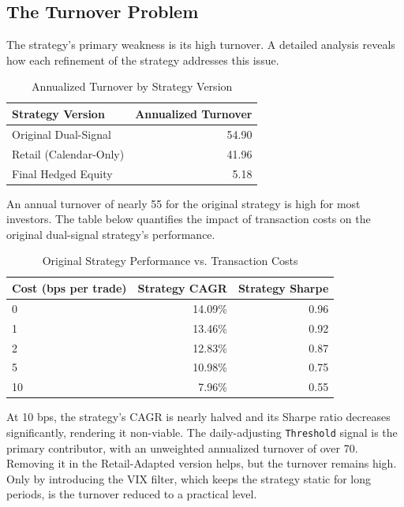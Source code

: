 \documentclass{article}
\begin{document}
\subsection{The Turnover Problem}
The strategy's primary weakness is its high turnover. A detailed analysis reveals how each refinement of the strategy addresses this issue.

\begin{table}[htbp]
\centering
\caption{Annualized Turnover by Strategy Version}
\begin{tabular}{lr}
\toprule
\textbf{Strategy Version} & \textbf{Annualized Turnover} \\
\midrule
Original Dual-Signal      & 54.90 \\
Retail (Calendar-Only)    & 41.96 \\
Final Hedged Equity       & 5.18  \\
\bottomrule
\end{tabular}
\end{table}

An annual turnover of nearly 55 for the original strategy is high for most investors. The table below quantifies the impact of transaction costs on the original dual-signal strategy's performance.

\begin{table}[htbp]
\centering
\caption{Original Strategy Performance vs. Transaction Costs}
\begin{tabular}{lrr}
\toprule
\textbf{Cost (bps per trade)} & \textbf{Strategy CAGR} & \textbf{Strategy Sharpe} \\
\midrule
0          & 14.09\%        & 0.96            \\
1          & 13.46\%        & 0.92            \\
2          & 12.83\%        & 0.87            \\
5          & 10.98\%        & 0.75            \\
10         & 7.96\%         & 0.55            \\
\bottomrule
\end{tabular}
\end{table}

At 10 bps, the strategy's CAGR is nearly halved and its Sharpe ratio decreases significantly, rendering it non-viable. The daily-adjusting \texttt{Threshold} signal is the primary contributor, with an unweighted annualized turnover of over 70. Removing it in the Retail-Adapted version helps, but the turnover remains high. Only by introducing the VIX filter, which keeps the strategy static for long periods, is the turnover reduced to a practical level.
\end{document}
